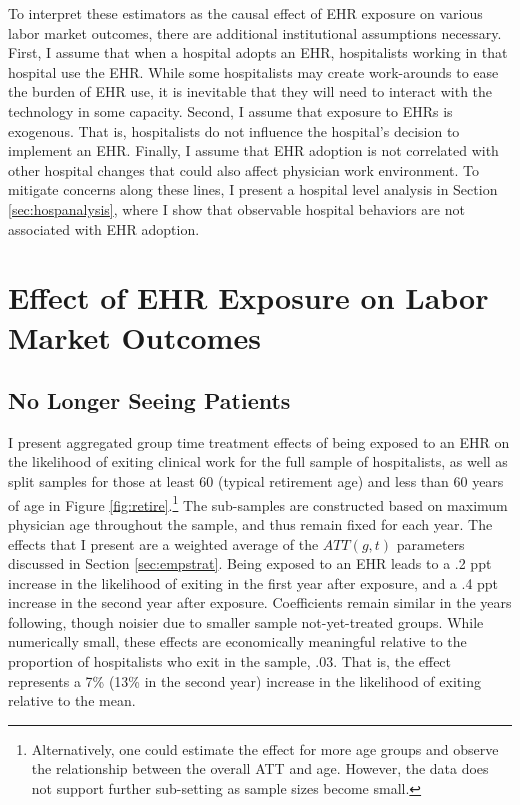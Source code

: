 \documentclass[12pt]{article}
\begin{document}
To interpret these estimators as the causal effect of EHR exposure on various labor market outcomes, there are additional institutional assumptions necessary. First, I assume that when a hospital adopts an EHR, hospitalists working in that hospital use the EHR. While some hospitalists may create work-arounds to ease the burden of EHR use, it is inevitable that they will need to interact with the technology in some capacity. Second, I assume that exposure to EHRs is exogenous. That is, hospitalists do not influence the hospital's decision to implement an EHR. Finally, I assume that EHR adoption is not correlated with other hospital changes that could also affect physician work environment. To mitigate concerns along these lines, I present a hospital level analysis in Section \ref{sec:hospanalysis}, where I show that observable hospital behaviors are not associated with EHR adoption.


\section{Effect of EHR Exposure on Labor Market Outcomes}


\subsection{No Longer Seeing Patients}\label{sec:retire}


I present aggregated group time treatment effects of being exposed to an EHR on the likelihood of exiting clinical work for the full sample of hospitalists, as well as split samples for those at least 60 (typical retirement age) and less than 60 years of age in Figure \ref{fig:retire}.\footnote{Alternatively, one could estimate the effect for more age groups and observe the relationship between the overall ATT and age. However, the data does not support further sub-setting as sample sizes become small.} The sub-samples are constructed based on maximum physician age throughout the sample, and thus remain fixed for each year. The effects that I present are a weighted average of the $ATT(g,t)$ parameters discussed in Section \ref{sec:empstrat}. Being exposed to an EHR leads to a .2 ppt increase in the likelihood of exiting in the first year after exposure, and a .4 ppt increase in the second year after exposure. Coefficients remain similar in the years following, though noisier due to smaller sample not-yet-treated groups. While numerically small, these effects are economically meaningful relative to the proportion of hospitalists who exit in the sample, .03. That is, the effect represents a 7\% (13\% in the second year) increase in the likelihood of exiting relative to the mean.   
\end{document}
